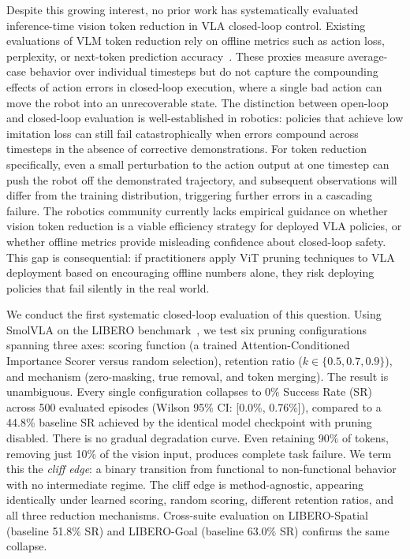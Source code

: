 Despite this growing interest, no prior work has systematically evaluated inference-time vision token reduction in VLA closed-loop control.
Existing evaluations of VLM token reduction rely on offline metrics such as action loss, perplexity, or next-token prediction accuracy~\cite{chen2024fastv,cheng2026vlaiap}.
These proxies measure average-case behavior over individual timesteps but do not capture the compounding effects of action errors in closed-loop execution, where a single bad action can move the robot into an unrecoverable state.
The distinction between open-loop and closed-loop evaluation is well-established in robotics: policies that achieve low imitation loss can still fail catastrophically when errors compound across timesteps in the absence of corrective demonstrations.
For token reduction specifically, even a small perturbation to the action output at one timestep can push the robot off the demonstrated trajectory, and subsequent observations will differ from the training distribution, triggering further errors in a cascading failure.
The robotics community currently lacks empirical guidance on whether vision token reduction is a viable efficiency strategy for deployed VLA policies, or whether offline metrics provide misleading confidence about closed-loop safety.
This gap is consequential: if practitioners apply ViT pruning techniques to VLA deployment based on encouraging offline numbers alone, they risk deploying policies that fail silently in the real world.

We conduct the first systematic closed-loop evaluation of this question.
Using SmolVLA on the LIBERO benchmark~\cite{liu2023libero}, we test six pruning configurations spanning three axes: scoring function (a trained Attention-Conditioned Importance Scorer versus random selection), retention ratio ($k \in \{0.5, 0.7, 0.9\}$), and mechanism (zero-masking, true removal, and token merging).
The result is unambiguous.
Every single configuration collapses to 0\% Success Rate (SR) across 500 evaluated episodes (Wilson 95\% CI: [0.0\%, 0.76\%]), compared to a 44.8\% baseline SR achieved by the identical model checkpoint with pruning disabled.
There is no gradual degradation curve.
Even retaining 90\% of tokens, removing just 10\% of the vision input, produces complete task failure.
We term this the \emph{cliff edge}: a binary transition from functional to non-functional behavior with no intermediate regime.
The cliff edge is method-agnostic, appearing identically under learned scoring, random scoring, different retention ratios, and all three reduction mechanisms.
Cross-suite evaluation on LIBERO-Spatial (baseline 51.8\% SR) and LIBERO-Goal (baseline 63.0\% SR) confirms the same collapse.

